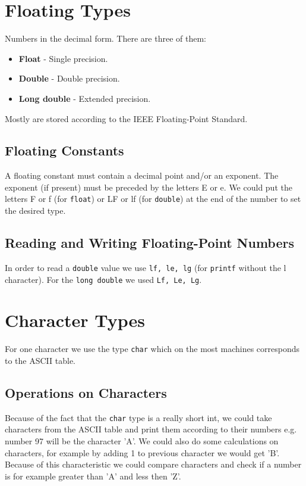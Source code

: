 \documentclass[openany]{book}
\begin{document}
    \section{Floating Types}
    Numbers in the decimal form. There are three of them:
    \begin{itemize}
        \item \textbf{Float} - Single precision.
        \item \textbf{Double} - Double precision.
        \item \textbf{Long double} - Extended precision.
    \end{itemize}
    Mostly are stored according to the IEEE Floating-Point Standard.

    \subsection*{Floating Constants}
    A floating constant must contain a decimal point and/or an exponent. The exponent (if present) must be preceded by the letters E or e. We could put the letters F or f (for \texttt{float}) or LF or lf (for \texttt{double}) at the end of the number to set the desired type.

    \subsection*{Reading and Writing Floating-Point Numbers}
    In order to read a \texttt{double} value we use \texttt{lf, le, lg} (for \texttt{printf} without the l character). For the \texttt{long double} we used \texttt{Lf, Le, Lg}.

    \section{Character Types}
    For one character we use the type \texttt{char} which on the most machines corresponds to the ASCII table.

    \subsection*{Operations on Characters}
    Because of the fact that the \texttt{char} type is a really short int, we could take characters from the ASCII table and print them according to their numbers e.g. number 97 will be the character 'A'. We could also do some calculations on characters, for example by adding 1 to previous character we would get 'B'. Because of this characteristic we could compare characters and check if a number is for example greater than 'A' and less then 'Z'.
\end{document}
